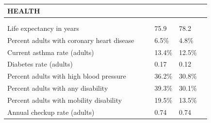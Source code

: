 \documentclass[9pt]{report}
\begin{document}
\newpage
\setlength{\tabcolsep}{.01in} %
\begin{tabular}{p{.10in}p{.10in}p{.10in}p{3.7in}>{\hfill}p{.85in}>{\hfill}p{.85in}>{\hfill}p{.85in}>{\hfill}p{.85in}p{0.1in}}
\multicolumn{9}{l}{\parbox{7.1in}{\raggedright{\large{\strut\textbf{HEALTH}\strut}}}} \\ 
\hline
\multicolumn{4}{l}{\parbox{3.5in}{\raggedright{\textbf{}}}} & \multicolumn{1}{r}{\parbox{.85in}{\strut\raggedleft{\textbf{}\strut}}} & \multicolumn{1}{r}{\parbox{.85in}{\strut\raggedleft{\textbf{}\strut}}} & \multicolumn{1}{r}{\parbox{.85in}{\strut{}}} & \multicolumn{1}{r}{\parbox{.85in}{\strut{}}} & \\ 
\multicolumn{9}{l}{} \\ 
\multicolumn{4}{l}{\parbox{3.6in}{\strut\raggedright{{Life expectancy in years}}\strut}} &  &  & 75.9 & 78.2 & \multicolumn{1}{l}{}  \\ 
\multicolumn{4}{l}{\parbox{3.6in}{\strut\raggedright{{Percent adults with coronary heart disease}}\strut}} &  &  & 6.5\% & 4.8\% & \multicolumn{1}{l}{}  \\ 
\multicolumn{4}{l}{\parbox{3.6in}{\strut\raggedright{{Current asthma rate (adults)}}\strut}} &  &  & 13.4\% & 12.5\% & \multicolumn{1}{l}{}  \\ 
\multicolumn{4}{l}{\parbox{3.6in}{\strut\raggedright{{Diabetes rate (adults)}}\strut}} &  &  & 0.17 & 0.12 & \multicolumn{1}{l}{}  \\ 
\multicolumn{4}{l}{\parbox{3.6in}{\strut\raggedright{{Percent adults with high blood pressure}}\strut}} &  &  & 36.2\% & 30.8\% & \multicolumn{1}{l}{}  \\ 
\multicolumn{4}{l}{\parbox{3.6in}{\strut\raggedright{{Percent adults with any disability}}\strut}} &  &  & 39.3\% & 30.1\% & \multicolumn{1}{l}{}  \\ 
\multicolumn{4}{l}{\parbox{3.6in}{\strut\raggedright{{Percent adults with mobility disability}}\strut}} &  &  & 19.5\% & 13.5\% & \multicolumn{1}{l}{}  \\ 
\multicolumn{4}{l}{\parbox{3.6in}{\strut\raggedright{{Annual checkup rate (adults)}}\strut}} &  &  & 0.74 & 0.74 & \multicolumn{1}{l}{}  \\ 

\end{tabular}
\end{document}
